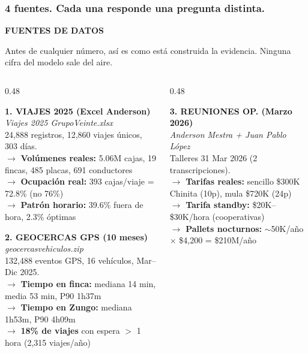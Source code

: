 \documentclass[aspectratio=169, 10pt]{beamer}
\newcommand{\tagline}[2]{{\scriptsize\color{#1}\textbf{\MakeUppercase{#2}}}}
\begin{document}
\begin{frame}
\frametitle{4 fuentes. Cada una responde una pregunta distinta.}
\tagline{azul}{Fuentes de Datos}
\vspace{-2pt}

{\scriptsize Antes de cualquier n\'umero, as\'i es como est\'a construida la evidencia. Ninguna cifra del modelo sale del aire.}

\vspace{4pt}
\begin{columns}[T]
\begin{column}{0.48\textwidth}

\colorbox{azulclaro}{\parbox{\dimexpr\linewidth-8pt}{\tiny\strut
\textcolor{azul}{\textbf{1. VIAJES 2025 (Excel Anderson)}}\\[2pt]
{\scriptsize\textit{Viajes 2025 GrupoVeinte.xlsx}}\\
24,888 registros, 12,860 viajes \'unicos, 303 d\'ias.\\[3pt]
$\rightarrow$ \textbf{Vol\'umenes reales:} 5.06M cajas, 19 fincas, 485 placas, 691 conductores\\
$\rightarrow$ \textbf{Ocupaci\'on real:} 393 cajas/viaje = 72.8\% (no 76\%)\\
$\rightarrow$ \textbf{Patr\'on horario:} 39.6\% fuera de hora, 2.3\% \'optimas
\strut}}

\vspace{6pt}
\colorbox{rojoclaro}{\parbox{\dimexpr\linewidth-8pt}{\tiny\strut
\textcolor{rojo}{\textbf{2. GEOCERCAS GPS (10 meses)}}\\[2pt]
{\scriptsize\textit{geocercasvehiculos.zip}}\\
132,488 eventos GPS, 16 veh\'iculos, Mar--Dic 2025.\\[3pt]
$\rightarrow$ \textbf{Tiempo en finca:} mediana 14 min, media 53 min, P90 1h37m\\
$\rightarrow$ \textbf{Tiempo en Zungo:} mediana 1h53m, P90 4h09m\\
$\rightarrow$ \textbf{18\% de viajes} con espera $>$ 1 hora (2,315 viajes/a\~no)
\strut}}

\end{column}
\begin{column}{0.48\textwidth}

\colorbox{amarilloclaro}{\parbox{\dimexpr\linewidth-8pt}{\tiny\strut
\textcolor{amarillo}{\textbf{3. REUNIONES OP. (Marzo 2026)}}\\[2pt]
{\scriptsize\textit{Anderson Mestra + Juan Pablo L\'opez}}\\
Talleres 31 Mar 2026 (2 transcripciones).\\[3pt]
$\rightarrow$ \textbf{Tarifas reales:} sencillo \$300K Chinita (10p), mula \$720K (24p)\\
$\rightarrow$ \textbf{Tarifa standby:} \$20K--\$30K/hora (cooperativas)\\
$\rightarrow$ \textbf{Pallets nocturnos:} $\sim$50K/a\~no $\times$ \$4,200 = \$210M/a\~no
\strut}}


\end{column}
\end{columns}
\end{frame}
\end{document}
